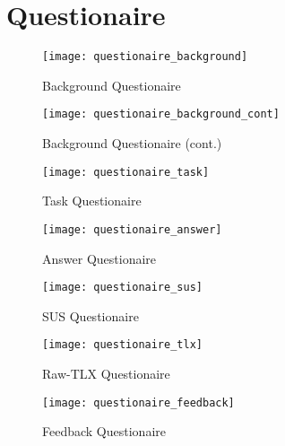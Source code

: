 \chapter{Questionaire}\label{sec:appendix}

\begin{figure*}[!htb]
  \centering
  \texttt{[image: questionaire\_background]}
  \caption{Background Questionaire}
  \label{fig:questionaire_background}
\end{figure*}
\begin{figure*}[!htb]
  \ContinuedFloat
  \centering
  \texttt{[image: questionaire\_background\_cont]}
  \caption[]{Background Questionaire (cont.)}
\end{figure*}

\begin{figure*}[!htb]
  \centering
  \texttt{[image: questionaire\_task]}
  \caption{Task Questionaire}
  \label{fig:questionaire_task}
\end{figure*}

\begin{figure*}[!htb]
  \centering
  \texttt{[image: questionaire\_answer]}
  \caption{Answer Questionaire}
  \label{fig:questionaire_answer}
\end{figure*}

\begin{figure*}[!htb]
  \centering
  \texttt{[image: questionaire\_sus]}
  \caption{SUS Questionaire}
  \label{fig:questionaire_sus}
\end{figure*}

\begin{figure*}[!htb]
  \centering
  \texttt{[image: questionaire\_tlx]}
  \caption{Raw-TLX Questionaire}
  \label{fig:questionaire_tlx}
\end{figure*}

\begin{figure*}[!htb]
  \centering
  \texttt{[image: questionaire\_feedback]}
  \caption{Feedback Questionaire}
  \label{fig:questionaire_feedback}
\end{figure*}
